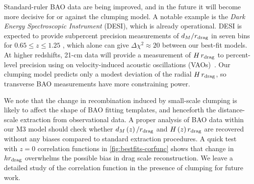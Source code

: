 Standard-ruler BAO data are being improved, and in the future it will become more decisive for or against the clumping model.
A notable example is the {\it Dark Energy Spectroscopic Instrument} (DESI), which is already operational.
DESI is expected to provide subpercent precision measurements of $d_M/r_{\rm drag}$ in seven bins for $0.65\le z\le 1.25$ \citep{DESI2016a.Science}, which alone can give $\Delta\chi^2\approx 20$ between our best-fit models.
At higher redshifts, 21-cm data will provide a measurement of $H\, r_{\rm drag}$ to percent-level precision using on velocity-induced acoustic oscillations (VAOs)~\citep{HERA-VAO}.
Our clumping model predicts only a modest deviation of the radial $H\, r_{\rm drag}$, so transverse BAO measurements have more constraining power.

We note that the change in recombination induced by small-scale clumping is likely to affect the shape of BAO fitting templates, and henceforth the distance-scale extraction from observational data.
A proper analysis of BAO data within our M3 model should check whether $d_M\left(z\right)/r_{\rm drag}$ and $H\left(z\right)r_{\rm drag}$ are recovered without any biases compared to standard extraction procedures.
A quick test with $z=0$ correlation functions in \cref{fig:bestfits-corfunc} shows that change in $hr_{\rm drag}$ overwhelms the possible bias in drag scale reconstruction.
We leave a detailed study of the correlation function in the presence of clumping for future work.

